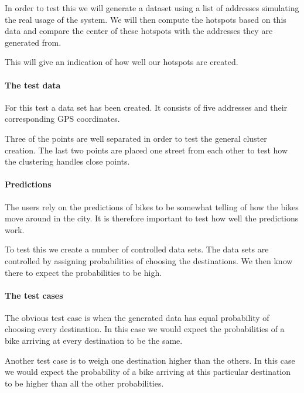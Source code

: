 In order to test this we will generate a dataset using a list of addresses simulating the real usage of the system.
We will then compute the hotspots based on this data and compare the center of these hotspots with the addresses they are generated from.

This will give an indication of how well our hotspots are created.

\paragraph{The test data}
For this test a data set has been created.
It consists of five addresses and their corresponding GPS coordinates.

Three of the points are well separated in order to test the general cluster creation.
The last two points are placed one street from each other to test how the clustering handles close points.


\paragraph{Predictions}
The users rely on the predictions of bikes to be somewhat telling of how the bikes move around in the city.
It is therefore important to test how well the predictions work.

To test this we create a number of controlled data sets.
The data sets are controlled by assigning probabilities of choosing the destinations. 
We then know there to expect the probabilities to be high.

\paragraph{The test cases}
The obvious test case is when the generated data has equal probability of choosing every destination. 
In this case we would expect the probabilities of a bike arriving at every destination to be the same.

Another test case is to weigh one destination higher than the others.
In this case we would expect the probability of a bike arriving at this particular destination to be higher than all the other probabilities.